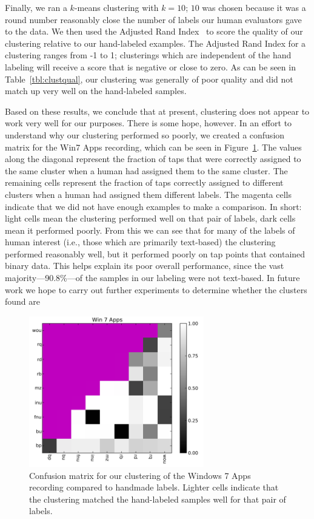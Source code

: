 Finally, we ran a $k$-means clustering with $k = 10$; $10$ was chosen
because it was a round number reasonably close the number of labels our
human evaluators gave to the data. We then used the Adjusted Rand
Index~\cite{Hubert:1985zr} to score the quality of our clustering
relative to our hand-labeled examples. The Adjusted Rand Index for a
clustering ranges from -1 to 1; clusterings which are independent of the
hand labeling will receive a score that is negative or close to zero. As
can be seen in Table~\ref{tbl:clustqual}, our clustering was generally
of poor quality and did not match up very well on the hand-labeled
samples.

Based on these results, we conclude that at present, clustering does not
appear to work very well for our purposes. There is some hope, however.
In an effort to understand why our clustering performed so poorly, we
created a confusion matrix for the Win7 Apps recording, which can be
seen in Figure~\ref{fig:win7apps}. The values along the diagonal
represent the fraction of taps that were correctly assigned to the
same cluster when a human had assigned them to the same cluster. The
remaining cells represent the fraction of taps correctly assigned to
different clusters when a human had assigned them different labels. The
magenta cells indicate that we did not have enough examples to make a
comparison. In short: light cells mean the clustering performed well on
that pair of labels, dark cells mean it performed poorly. From this we
can see that for many of the labels of human interest (i.e., those which
are primarily text-based) the clustering performed reasonably well,
but it performed poorly on tap points that contained binary data. This
helps explain its poor overall performance, since the vast
majority---90.8\%---of the samples in our labeling were not text-based.
In future work we hope to carry out further experiments to determine
whether the clusters found are

\begin{figure}
    \centering
    \includegraphics[width=3in]{figures/win7apps.png}
    \caption{Confusion matrix for our clustering of the Windows 7 Apps
    recording compared to handmade labels. Lighter cells indicate that
    the clustering matched the hand-labeled samples well for that
    pair of labels.}
    \label{fig:win7apps}
\end{figure}

